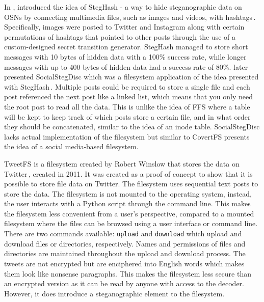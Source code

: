 In \citeyear{szczypiorskiStegHashNewMethod2016}, \citeauthor{szczypiorskiStegHashNewMethod2016} introduced the idea of StegHash - a way to hide steganographic data on \gls{OSNs} by connecting multimedia files, such as images and videos, with hashtags\,\cite{szczypiorskiStegHashNewMethod2016}. Specifically, images were posted to Twitter and Instagram along with certain permutations of hashtags that pointed to other posts through the use of a \mbox{custom-designed} secret transition generator. StegHash managed to store short messages with 10 bytes of hidden data with a 100\% success rate, while longer messages with up to 400 bytes of hidden data had a success rate of 80\%. \citeauthor{bieniaszSocialStegDiscApplicationSteganography2017} later presented SocialStegDisc which was a filesystem application of the idea presented with StegHash\,\cite{bieniaszSocialStegDiscApplicationSteganography2017}. Multiple posts could be required to store a single file and each post referenced the next post like a linked list, which means that you only need the root post to read all the data. This is unlike the idea of \gls{FFS} where a table will be kept to keep track of which posts store a certain file, and in what order they should be concatenated, similar to the idea of an inode table. SocialStegDisc lacks actual implementation of the filesystem but similar to CovertFS presents the idea of a social \mbox{media-based} filesystem.

TweetFS is a filesystem created by Robert Winslow that stores the data on Twitter\,\cite{winslowTweetfsTweetfsMaster}, created in 2011. It was created as a proof of concept to show that it is possible to store file data on Twitter. The filesystem uses sequential text posts to store the data. The filesystem is not mounted to the operating system, instead, the user interacts with a Python script  through the command line. This makes the filesystem less convenient from a user's perspective, compared to a mounted filesystem where the files can be browsed using a user interface or command line. There are two commands available: \texttt{upload} and \texttt{download} which upload and download files or directories, respectively. Names and permissions of files and directories are maintained throughout the upload and download process. The tweets are not encrypted but are enciphered into English words which makes them look like nonsense paragraphs. This makes the filesystem less secure than an encrypted version as it can be read by anyone with access to the decoder. However, it does introduce a steganographic element to the filesystem.

